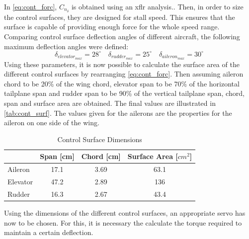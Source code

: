 In \autoref{eq:cont_forc}, $C_{n_{\delta}}$ is obtained using an xflr analysis.. Then, in order to size the control surfaces, they are designed for stall speed. This ensures that the surface is capable of providing enough force for the whole speed range. Comparing control surface deflection angles of different aircraft, the following maximum deflection angles were defined: 
\begin{equation*}
    \delta_{elevator_{max}} = 28^\circ\quad\delta_{rudder_{max}} = 25^\circ\quad\delta_{aileron_{max}} = 30 ^\circ
\end{equation*}
Using these parameters, it is now possible to calculate the surface area of the different control surfaces by rearranging \autoref{eq:cont_forc}. 
Then assuming aileron chord to be 20\% of the wing chord, elevator span to be 70\% of the horizontal tailplane span and rudder span to be 90\% of the vertical tailplane span, chord, span and surface area are obtained. The final values are illustrated in \autoref{tab:cont_surf}. The values given for the ailerons are the properties for the aileron on one side of the wing. 

\begin{table}[htb]
    \centering
    \begin{tabular}{lccc}
      \toprule
        & Span [cm]& Chord [cm]& Surface Area [$cm^2$]\\
      \midrule
      Aileron & 17.1 & 3.69 & 63.1 \\\hdashline
      Elevator & 47.2 &2.89& 136 \\\hdashline
      Rudder & 16.3 & 2.67 & 43.4\\\bottomrule
    \end{tabular}
    \caption{Control Surface Dimensions}
    \label{tab:cont_surf}
\end{table}

Using the dimensions of the different control surfaces, an appropriate servo has now to be chosen. For this, it is necessary the calculate the torque required to maintain a certain deflection. 

